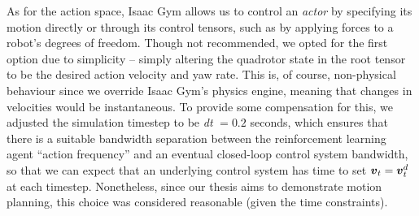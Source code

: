 As for the action space, Isaac Gym allows us to control an \textit{actor} by specifying its motion directly or through its control tensors, such as by applying forces to a robot's degrees of freedom. Though not recommended, we opted for the first option due to simplicity -- simply altering the quadrotor state in the root tensor to be the desired action velocity and yaw rate. This is, of course, non-physical behaviour since we override Isaac Gym's physics engine, meaning that changes in velocities would be instantaneous. 
To provide some compensation for this, we adjusted the simulation timestep to be \textit{dt} $= 0.2$ seconds, which ensures that there is a suitable bandwidth separation between the reinforcement learning agent “action frequency” and an eventual closed-loop control system bandwidth, so that we can expect that an underlying control system has time to set ${\boldsymbol{v}}_t = {\boldsymbol{v}}_t^d$ at each timestep. Nonetheless, since our thesis aims to demonstrate motion planning, this choice was considered reasonable (given the time constraints).

